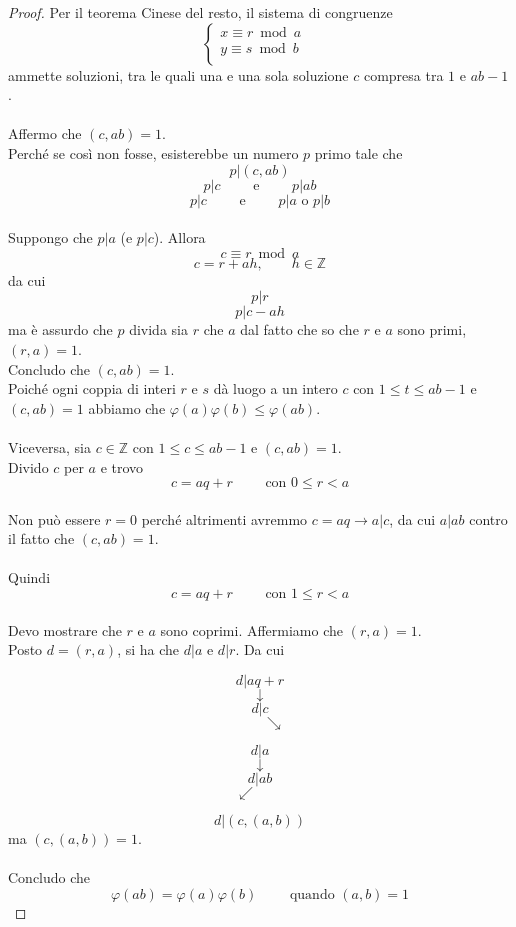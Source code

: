 \documentclass[a4paper,12pt, oneside]{book}
\begin{document}
\begin{enumerate}
\begin{proof}
		      Per il teorema Cinese del resto, il sistema di congruenze
		      $$\begin{cases}
				      x \equiv r \bmod a   \\
				      y \equiv s \bmod b & \\
			      \end{cases}$$
		      ammette soluzioni, tra le quali una e una sola soluzione $c$ compresa tra $1$ e $ab-1$.\\\\
		      Affermo che $(c,ab)=1$.\\
		      Perché se così non fosse, esisterebbe un numero $p$ primo tale che
		      $$p|(c,ab)$$
		      $$p|c \qquad \mbox{ e } \qquad p|ab$$
		      $$p|c \qquad \mbox{ e } \qquad p|a \mbox{ o } p|b$$\\
		      Suppongo che $p|a$ (e $p|c$).
		      Allora $$c \equiv r \bmod a$$
		      $$c = r+ah, \qquad h \in \mathbb{Z}$$
		      da cui $$p|r$$ $$p|c-ah$$ ma è assurdo che $p$ divida sia $r$ che $a$ dal fatto che so che $r$ e $a$ sono primi, $(r,a)=1$.\\
		      Concludo che $(c,ab)=1$.\\
		      Poiché ogni coppia di interi $r$ e $s$ dà luogo a un intero $c$ con $1 \leq t \leq ab-1$ e $(c,ab)=1$ abbiamo che $\varphi(a)\varphi(b) \leq \varphi(ab).$
		      \\\\
		      Viceversa, sia $c \in \mathbb{Z}$ con $1 \leq c \leq ab-1$ e $(c,ab)=1$.\\
		      Divido $c$ per $a$ e trovo
		      $$c = aq+r \qquad \mbox{ con } 0 \leq r < a$$\\
		      Non può essere $r=0$ perché altrimenti avremmo $c = aq \rightarrow a|c$, da cui $a|ab$ contro il fatto che $(c,ab)=1$.\\\\
		      Quindi
		      $$c = aq+r \qquad \mbox{ con } 1 \leq r < a$$\\
		      Devo mostrare che $r$ e $a$ sono coprimi. Affermiamo che $(r,a)=1$.\\
		      Posto $d = (r,a)$, si ha che $d|a$ e $d|r$. Da cui

		      \begin{minipage}{0.45\textwidth}
			      $$d|aq+r$$
			      $$\downarrow$$
			      $$d|c$$
			      $$\qquad \searrow$$
		      \end{minipage}%
		      \hfill
		      \begin{minipage}{0.45\textwidth}
			      $$d|a$$
			      $$\downarrow$$
			      $$d|ab$$
			      $$\swarrow \qquad$$
		      \end{minipage}%

		      $$d|(c, (a,b))$$
		      ma $(c, (a,b)) = 1$.\\\\
		      Concludo che $$\varphi(ab)=\varphi(a)\varphi(b) \qquad \mbox{ quando } (a,b)=1$$

	      \end{proof}

\end{enumerate}
\end{document}
